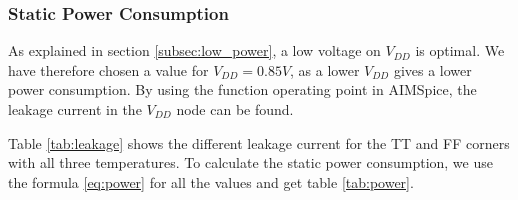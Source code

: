 \subsubsection{Static Power Consumption}

As explained in section \ref{subsec:low_power}, a low voltage on $V_{DD}$ is optimal. We have therefore chosen a value for $V_{DD} = 0.85V$, as a lower $V_{DD}$ gives a lower power consumption. By using the function operating point in AIMSpice, the leakage current in the $V_{DD}$ node can be found.

Table \ref{tab:leakage} shows the different leakage current for the TT and FF corners with all three temperatures. To calculate the static power consumption, we use the formula \ref{eq:power} for all the values and get table \ref{tab:power}.

\begin{table}[H]
\centering
\caption{Leakage Current}
\label{tab:leakage}
\end{table}

\begin{table}[H]
\centering
\caption{Static Power Consumption}
\label{tab:power}
\end{table}


